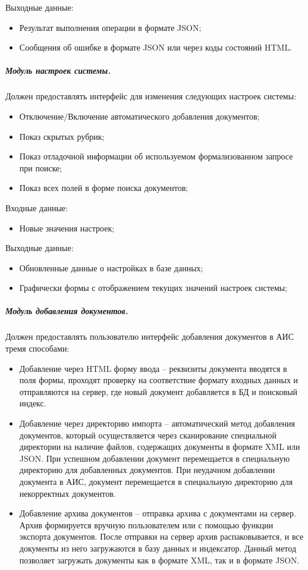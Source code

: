 Выходные данные:
\begin{itemize}
\item Результат выполнения операции в формате JSON;
\item Сообщения об ошибке в формате JSON или через коды состояний HTML.
\end{itemize}

\subparagraph{Модуль настроек системы.}
Должен предоставлять интерфейс для изменения следующих настроек системы:
\begin{itemize}
\item Отключение/Включение автоматического добавления документов;
\item Показ скрытых рубрик;
\item Показ отладочной информации об используемом формализованном запросе при поиске;
\item Показ всех полей в форме поиска документов;
\end{itemize}

Входные данные:
\begin{itemize}
\item Новые значения настроек;
\end{itemize}

Выходные данные:
\begin{itemize}
\item Обновленные данные о настройках в базе данных;
\item Графически формы с отображением текущих значений настроек системы;
\end{itemize}

\subparagraph{Модуль добавления документов.}
Должен предоставлять пользователю интерфейс добавления документов в АИС тремя способами:
\begin{itemize}
\item Добавление через HTML форму ввода -- реквизиты документа вводятся в поля формы, проходят проверку на соответствие формату входных данных и отправляются на сервер, где новый документ добавляется в БД и поисковый индекс.
\item Добавление через директорию импорта -- автоматический метод добавления документов, который осуществляется через сканирование специальной директории на наличие файлов, содержащих документы в формате XML или JSON. При успешном добавлении документ перемещается в специальную директорию для добавленных документов. При неудачном добавлении документа в АИС, документ перемещается в специальную директорию для некорректных документов.
\item Добавление архива документов -- отправка архива с документами на сервер. Архив формируется вручную пользователем или с помощью функции экспорта документов. После отправки на сервер архив распаковывается, и все документы из него загружаются в базу данных и индексатор. Данный метод позволяет загружать документы как в формате XML, так и в формате JSON.
\end{itemize}

